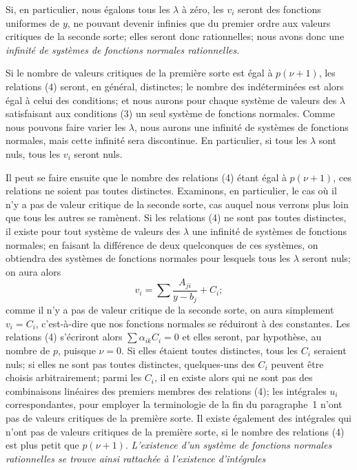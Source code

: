 \documentclass{article}
\begin{document}
Si, en particulier, nous égalons tous les $\lambda$ à zéro, les $v_{i}$ seront des fonctions uniformes de $y$, ne pouvant devenir infinies que du premier ordre aux valeurs critiques de la seconde sorte; elles seront donc rationnelles; nous avons donc une \emph{infinité de systèmes de fonctions normales rationnelles}.

Si le nombre de valeurs critiques de la première sorte est égal à $p(\nu + 1)$, les relations (4) seront, en général, distinctes; le nombre des indéterminées est alors égal à celui des conditions; et nous aurons pour chaque système de valeurs des $\lambda$ satisfaisant aux conditions (3) un seul système de fonctions normales. Comme nous pouvons faire varier les $\lambda$, nous aurons une infinité de systèmes de fonctions normales, mais cette infinité sera discontinue. En particulier, si tous les $\lambda$ sont nuls, tous les $v_{i}$ seront nuls.

Il peut se faire ensuite que le nombre des relations (4) étant égal à $p(\nu + 1)$, ces relations ne soient pas toutes distinctes. Examinons, en particulier, le cas où il n'y a pas de valeur critique de la seconde sorte, cas auquel nous verrons plus loin que tous les autres se ramènent. Si les relations (4) ne sont pas toutes distinctes, il existe pour tout système de valeurs des $\lambda$ une infinité de systèmes de fonctions normales; en faisant la différence de deux quelconques de ces systèmes, on obtiendra des systèmes de fonctions normales pour lesquels tous les $\lambda$ seront nuls; on aura alors
\[
v_{i} = \sum \frac{A_{ji}}{y - b_{j}} + C_{i};
\]
comme il n'y a pas de valeur critique de la seconde sorte, on aura simplement $v_{i} = C_{i}$, c'est-à-dire que nos fonctions normales se réduiront à des constantes. Les relations (4) s'écriront alors $\displaystyle\sum \alpha_{ik} C_{i} = 0$ et elles seront, par hypothèse, au nombre de $p$, puisque $\nu = 0$. Si elles étaient toutes distinctes, tous les $C_{i}$ seraient nuls; si elles ne sont pas toutes distinctes, quelques-uns des $C_{i}$ peuvent être choisis arbitrairement; parmi les $C_{i}$, il en existe alors qui ne sont pas des combinaisons linéaires des premiers membres des relations (4); les intégrales $u_{i}$ correspondantes, pour employer la terminologie de la fin du paragraphe~1 n'ont pas de valeurs critiques de la première sorte. Il existe également des intégrales qui n'ont pas de valeurs critiques de la première sorte, si le nombre des relations (4) est plus petit que $p(\nu + 1)$. \emph{L'existence d'un système de fonctions normales rationnelles se trouve ainsi rattachée à l'existence d'intégrales}
\end{document}

